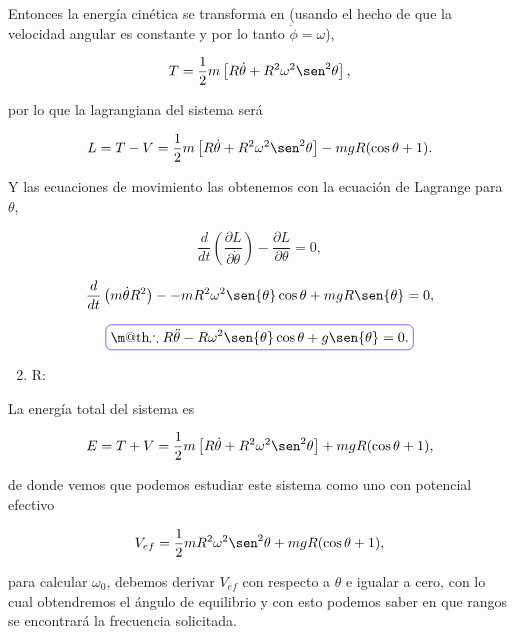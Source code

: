 \documentclass[a4paper,10pt]{article}
\makeatletter
\numberwithin{equation}{section}
\newcommand*{\boxcolor}{blue}
\renewcommand{\boxed}[1]{\textcolor{\boxcolor}{%
\tikz[baseline={([yshift=-1ex]current bounding box.center)}] \node [rectangle, minimum width=1ex,rounded corners,draw] {\normalcolor\m@th$\displaystyle#1$};}}
\makeatother
\begin{document}
Entonces la energía cinética se transforma en (usando el hecho de que la velocidad 
angular es constante y por lo tanto $\dot{\phi} = \omega$),

\begin{equation}
 T = \frac{1}{2}m\left[R\dot{\theta} + R^2\omega^2\sen^2{\theta} \right],
\end{equation}

por lo que la lagrangiana del sistema será

\begin{equation}
 L = T - V = \frac{1}{2}m\left[R\dot{\theta} + R^2\omega^2\sen^2{\theta} \right] 
 -  mgR(\cos{\theta} + 1).
\end{equation}

Y las ecuaciones de movimiento las obtenemos con la ecuación de Lagrange para 
$\theta$, 

\begin{equation}
 \frac{d}{dt}\left(\frac{\partial L}{\partial \dot{\theta}}\right) - 
 \frac{\partial L}{\partial \theta} = 0,
\end{equation}

\begin{equation}
 \frac{d}{dt}\left( m\dot{\theta}R^2 \right) - 
 - mR^2\omega^2\sen{\theta}\cos{\theta} + mgR\sen{\theta}  = 0,
\end{equation}

\begin{equation}
 \boxed{\therefore R\ddot{\theta} - R\omega^2\sen{\theta}\cos{\theta} + g\sen{\theta}
 = 0.}
\end{equation}

\begin{enumerate}[label=\alph*)]
\setcounter{enumi}{1}
 \item R:
\end{enumerate}

La energía total del sistema es 

\begin{equation}
 E = T + V =  \frac{1}{2}m\left[R\dot{\theta} + R^2\omega^2\sen^2{\theta} \right] 
 +  mgR(\cos{\theta} + 1),
\end{equation}

de donde vemos que podemos estudiar este sistema como uno con potencial efectivo 

\begin{equation}
 V_{ef} =  \frac{1}{2}mR^2\omega^2\sen^2{\theta}  +  mgR(\cos{\theta} + 1),
\end{equation}

para calcular $\omega_0$, debemos derivar $V_{ef}$ con respecto a $\theta$ e 
igualar a cero, con lo cual obtendremos el ángulo de equilibrio y con esto 
podemos saber en que rangos se encontrará la frecuencia solicitada.
\end{document}
